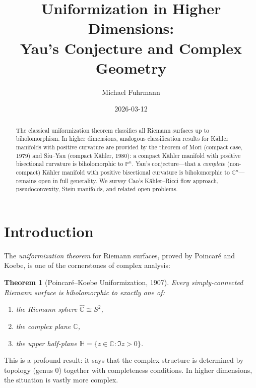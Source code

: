 \documentclass[12pt,a4paper]{amsart}
\newtheorem{theorem}{Theorem}[section]
\theoremstyle{definition}
\theoremstyle{remark}
\newcommand{\CC}{\mathbb{C}}
\newcommand{\PP}{\mathbb{P}}
\begin{document}
\begin{abstract}
The classical uniformization theorem classifies all Riemann surfaces up to
biholomorphism.  In higher dimensions, analogous classification results for
Kähler manifolds with positive curvature are provided by the theorem of
Mori (compact case, 1979) and Siu--Yau (compact Kähler, 1980): a compact
Kähler manifold with positive bisectional curvature is biholomorphic to
$\PP^n$.  Yau's conjecture---that a \emph{complete} (non-compact) Kähler
manifold with positive bisectional curvature is biholomorphic to $\CC^n$---
remains open in full generality.  We survey Cao's Kähler--Ricci flow
approach, pseudoconvexity, Stein manifolds, and related open problems.
\end{abstract}

\title{Uniformization in Higher Dimensions:\\
\large Yau's Conjecture and Complex Geometry}

\author{Michael Fuhrmann}
\address{Specialist Mathematics Project, Build 169}
\date{2026-03-12}

\maketitle
\tableofcontents

\section{Introduction}

The \emph{uniformization theorem} for Riemann surfaces, proved by Poincaré
and Koebe, is one of the cornerstones of complex analysis:

\begin{theorem}[Poincaré--Koebe Uniformization, 1907]
Every simply-connected Riemann surface is biholomorphic to exactly one of:
\begin{enumerate}[label=(\roman*)]
  \item the Riemann sphere $\hat{\CC} \cong S^2$,
  \item the complex plane $\CC$,
  \item the upper half-plane $\mathbb{H} = \{z \in \CC : \Im z > 0\}$.
\end{enumerate}
\end{theorem}

This is a profound result: it says that the complex structure is determined
by topology (genus 0) together with completeness conditions.  In higher
dimensions, the situation is vastly more complex.
\end{document}
